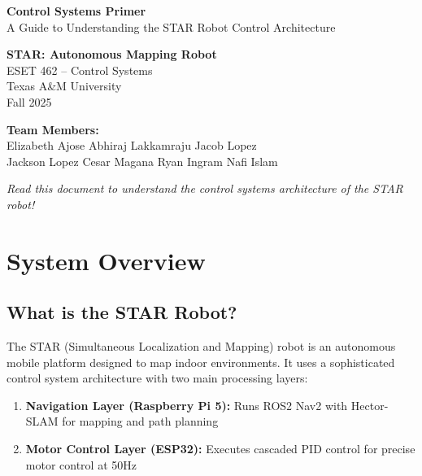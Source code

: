 \documentclass[11pt,letterpaper]{article}
\begin{document}
\begin{titlepage}
    \centering
    \vspace*{2cm}

    {\Huge\bfseries Control Systems Primer\\[0.5cm]}
    {\Large A Guide to Understanding the STAR Robot Control Architecture\\[2cm]}

    {\large\textbf{STAR: Autonomous Mapping Robot}\\[0.5cm]}
    {\large ESET 462 -- Control Systems\\[0.3cm]}
    {\large Texas A\&M University\\[0.3cm]}
    {\large Fall 2025\\[2cm]}

    \vfill

    {\large\textbf{Team Members:}\\[0.3cm]}
    Elizabeth Ajose \quad Abhiraj Lakkamraju \quad Jacob Lopez\\
    Jackson Lopez \quad Cesar Magana \quad Ryan Ingram \quad Nafi Islam

    \vfill

    {\small\textit{Read this document to understand the control systems architecture of the STAR robot!}}
\end{titlepage}

\tableofcontents
\newpage

\section{System Overview}

\subsection{What is the STAR Robot?}

The STAR (Simultaneous Localization and Mapping) robot is an autonomous mobile platform designed to map indoor environments. It uses a sophisticated control system architecture with two main processing layers:

\begin{enumerate}
    \item \textbf{Navigation Layer (Raspberry Pi 5):} Runs ROS2 Nav2 with Hector-SLAM for mapping and path planning
    \item \textbf{Motor Control Layer (ESP32):} Executes cascaded PID control for precise motor control at 50Hz
\end{enumerate}
\end{document}
